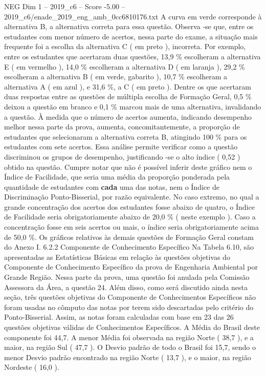 \begin{textsample}{NEG Dim 1 – 2019\_c6 – Score -5.00 – 2019\_c6/enade\_2019\_eng\_amb\_0cc6810176.txt}
A curva em verde corresponde à alternativa B, a alternativa correta para essa questão.
Observa -se que, entre os estudantes com menor número de acertos, nessa parte do exame, a situação mais frequente foi a escolha da alternativa C ( em preto ), incorreta.
Por exemplo, entre os estudantes que acertaram duas questões, 13,9 \% escolheram a alternativa E ( em vermelho ), 14,0 \% escolheram a alternativa D ( em laranja ), 29,2 \% escolheram a alternativa B ( em verde, gabarito ), 10,7 \% escolheram a alternativa A ( em azul ), e 31,6 \%, a C ( em preto ).
Dentre os que acertaram duas respostas entre as questões de múltipla escolha de Formação Geral, 0,5 \% deixou a questão em branco e 0,1 \% marcou mais de uma alternativa, invalidando a questão.
À medida que o número de acertos aumenta, indicando desempenho melhor nessa parte da prova, aumenta, concomitantemente, a proporção de estudantes que selecionaram a alternativa correta B, atingindo 100 \% para os estudantes com sete acertos.
Essa análise permite verificar como a questão discriminou os grupos de desempenho, justificando -se o alto índice ( 0,52 ) obtido na questão.
Cumpre notar que não é possível inferir deste gráfico nem o Índice de Facilidade, que seria uma média da proporção ponderada pela quantidade de estudantes com \textbf{cada} uma das notas, nem o Índice de Discriminação Ponto-Bisserial, por razão equivalente.
No caso extremo, no qual a grande concentração dos acertos dos estudantes fosse abaixo de quatro, o Índice de Facilidade seria obrigatoriamente abaixo de 20,0 \% ( neste exemplo ).
Caso a concentração fosse em seis acertos ou mais, o índice seria obrigatoriamente acima de 50,0 \%.
Os gráficos relativos às demais questões de Formação Geral constam do Anexo I. 6.2.2 Componente de Conhecimento Específico Na Tabela 6.10, são apresentadas as Estatísticas Básicas em relação às questões objetivas do Componente de Conhecimento Específico da prova de Engenharia Ambiental por Grande Região.
Nessa parte da prova, uma questão foi anulada pela Comissão Assessora da Área, a questão 24.
Além disso, como será discutido ainda nesta seção, três questões objetivas do Componente de Conhecimentos Específicos não foram usadas no cômputo das notas por terem sido descartadas pelo critério do Ponto-Bisserial.
Assim, as notas foram calculadas com base em 23 das 26 questões objetivas válidas de Conhecimentos Específicos.
A Média do Brasil deste componente foi 44,7.
A menor Média foi observada na região Norte ( 38,7 ), e a maior, na região Sul ( 47,7 ).
O Desvio padrão de todo o Brasil foi 15,7, sendo o menor Desvio padrão encontrado na região Norte ( 13,7 ), e o maior, na região Nordeste ( 16,0 ).

\end{textsample}
